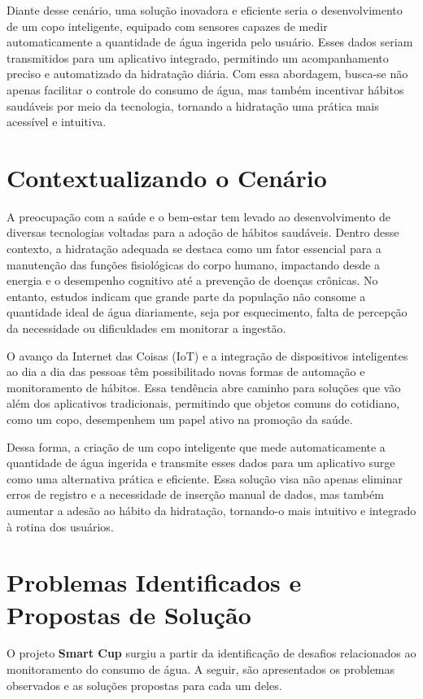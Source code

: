 \documentclass[12pt]{article}
\begin{document}
Diante desse cenário, uma solução inovadora e eficiente seria o desenvolvimento de um copo inteligente, equipado com sensores capazes de medir automaticamente a quantidade de água ingerida pelo usuário. Esses dados seriam transmitidos para um aplicativo integrado, permitindo um acompanhamento preciso e automatizado da hidratação diária. Com essa abordagem, busca-se não apenas facilitar o controle do consumo de água, mas também incentivar hábitos saudáveis por meio da tecnologia, tornando a hidratação uma prática mais acessível e intuitiva.

\section{Contextualizando o Cenário}

A preocupação com a saúde e o bem-estar tem levado ao desenvolvimento de diversas tecnologias voltadas para a adoção de hábitos saudáveis. Dentro desse contexto, a hidratação adequada se destaca como um fator essencial para a manutenção das funções fisiológicas do corpo humano, impactando desde a energia e o desempenho cognitivo até a prevenção de doenças crônicas. No entanto, estudos indicam que grande parte da população não consome a quantidade ideal de água diariamente, seja por esquecimento, falta de percepção da necessidade ou dificuldades em monitorar a ingestão.

O avanço da Internet das Coisas (IoT) e a integração de dispositivos inteligentes ao dia a dia das pessoas têm possibilitado novas formas de automação e monitoramento de hábitos. Essa tendência abre caminho para soluções que vão além dos aplicativos tradicionais, permitindo que objetos comuns do cotidiano, como um copo, desempenhem um papel ativo na promoção da saúde.

Dessa forma, a criação de um copo inteligente que mede automaticamente a quantidade de água ingerida e transmite esses dados para um aplicativo surge como uma alternativa prática e eficiente. Essa solução visa não apenas eliminar erros de registro e a necessidade de inserção manual de dados, mas também aumentar a adesão ao hábito da hidratação, tornando-o mais intuitivo e integrado à rotina dos usuários.


\newpage
\section{Problemas Identificados e Propostas de Solução}

O projeto \textbf{Smart Cup} surgiu a partir da identificação de desafios relacionados ao monitoramento do consumo de água. A seguir, são apresentados os problemas observados e as soluções propostas para cada um deles.
\end{document}

